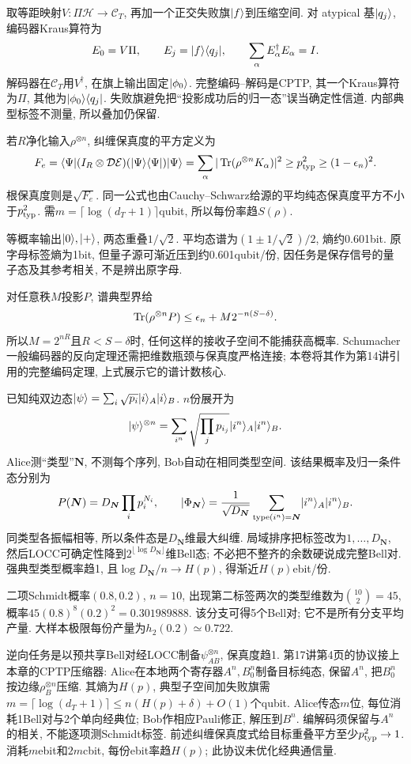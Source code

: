 取等距映射$V:\Pi\mathcal H\to\mathcal C_T$, 再加一个正交失败旗$\lvert f\rangle$到压缩空间. 对 atypical 基$\lvert q_j\rangle$, 编码器Kraus算符为
\[E_0=V\Pi,\qquad E_j=\lvert f\rangle\langle q_j\rvert,\qquad
 \sum_\alpha E_\alpha^\dagger E_\alpha=I.\]
解码器在$\mathcal C_T$用$V^\dagger$, 在旗上输出固定$\lvert \phi_0\rangle$. 完整编码--解码是CPTP, 其一个Kraus算符为$\Pi$, 其他为$\lvert \phi_0\rangle\langle q_j\rvert$. 失败旗避免把“投影成功后的归一态”误当确定性信道. 内部典型标签不测量, 所以叠加仍保留.

若$R$净化输入$\rho^{\otimes n}$, 纠缠保真度的平方定义为
\[F_e=\langle \Psi\rvert(I_R\otimes\mathcal D\mathcal E)(\lvert \Psi\rangle\langle \Psi\rvert)\lvert \Psi\rangle
 =\sum_\alpha|\operatorname{Tr}(\rho^{\otimes n}K_\alpha)|^2
 \ge p_{\rm typ}^2\ge(1-\epsilon_n)^2.\]
根保真度则是$\sqrt{F_e}$. 同一公式也由Cauchy--Schwarz给源的平均纯态保真度平方不小于$p_{\rm typ}^2$. 需$m=\lceil\log(d_T+1)\rceil$qubit, 所以每份率趋$S(\rho)$.

\begin{example}等概率输出$\lvert 0\rangle,\lvert +\rangle$, 两态重叠$1/\sqrt2$. 平均态谱为$(1\pm1/\sqrt2)/2$, 熵约0.601bit. 原字母标签熵为1bit, 但量子源可渐近压到约0.601qubit/份, 因任务是保存信号的量子态及其参考相关, 不是辨出原字母.\end{example}
对任意秩$M$投影$P$, 谱典型界给
\[\operatorname{Tr}(\rho^{\otimes n}P)\le\epsilon_n+M2^{-n(S-\delta)}.\]
所以$M=2^{nR}$且$R<S-\delta$时, 任何这样的接收子空间不能捕获高概率. Schumacher一般编码器的反向定理还需把维数瓶颈与保真度严格连接; 本卷将其作为第14讲引用的完整编码定理, 上式展示它的谱计数核心.

已知纯双边态$\lvert \psi\rangle=\sum_i\sqrt{p_i}\lvert i\rangle_A\lvert i\rangle_B$. $n$份展开为
\[\lvert \psi\rangle^{\otimes n}=\sum_{i^n}\sqrt{\prod_jp_{i_j}}\lvert i^n\rangle_A\lvert i^n\rangle_B.\]
Alice测“类型”$\boldsymbol N$, 不测每个序列, Bob自动在相同类型空间. 该结果概率及归一条件态分别为
\[P(\boldsymbol N)=D_{\boldsymbol N}\prod_ip_i^{N_i},\qquad
 \lvert \Phi_{\boldsymbol N}\rangle=\frac1{\sqrt{D_{\boldsymbol N}}}
 \sum_{\operatorname{type}(i^n)=\boldsymbol N}\lvert i^n\rangle_A\lvert i^n\rangle_B.\]
同类型各振幅相等, 所以条件态是$D_{\boldsymbol N}$维最大纠缠. 局域排序把标签改为$1,\ldots,D_{\boldsymbol N}$, 然后LOCC可确定性降到$2^{\lfloor\log D_{\boldsymbol N}\rfloor}$维Bell态; 不必把不整齐的余数硬说成完整Bell对. 强典型类型概率趋1, 且$\log D_{\boldsymbol N}/n\to H(p)$, 得渐近$H(p)$ebit/份.
\begin{example}二项Schmidt概率$(0.8,0.2)$, $n=10$, 出现第二标签两次的类型维数为$\binom{10}{2}=45$, 概率$45(0.8)^8(0.2)^2=0.301989888$. 该分支可得5个Bell对; 它不是所有分支平均产量. 大样本极限每份产量为$h_2(0.2)\simeq0.722$.\end{example}
逆向任务是以预共享Bell对经LOCC制备$\psi_{AB}^{\otimes n}$, 保真度趋1. 第17讲第4页的协议接上本章的CPTP压缩器: Alice在本地两个寄存器$A^n,B_0^n$制备目标纯态, 保留$A^n$, 把$B_0^n$按边缘$\rho_B^{\otimes n}$压缩. 其熵为$H(p)$, 典型子空间加失败旗需$m=\lceil\log(d_T+1)\rceil\le n(H(p)+\delta)+O(1)$个qubit. Alice传态$m$位, 每位消耗1Bell对与2个单向经典位; Bob作相应Pauli修正, 解压到$B^n$. 编解码须保留与$A^n$的相关, 不能逐项测Schmidt标签. 前述纠缠保真度式给目标重叠平方至少$p_{\rm typ}^2\to1$. 消耗$m$ebit和$2m$cbit, 每份ebit率趋$H(p)$; 此协议未优化经典通信量.

